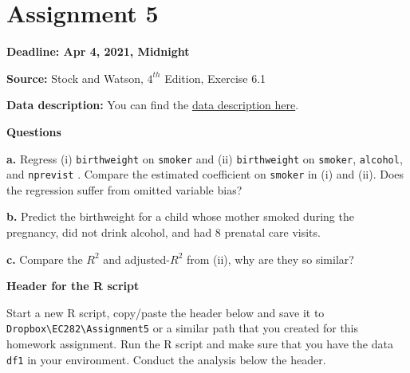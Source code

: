 \documentclass[
]{book}
\begin{document}
\hypertarget{assignment-5}{%
\section{Assignment 5}\label{assignment-5}}

\textbf{Deadline: Apr 4, 2021, Midnight}

\textbf{Source:} Stock and Watson, \(4^{th}\) Edition, Exercise 6.1

\textbf{Data description:} You can find the \href{https://www.dropbox.com/s/s0q564v6lplbexu/Birthweight_Smoking_Description.pdf?dl=1}{data description here}.

\textbf{Questions}

\textbf{a.} Regress (i) \texttt{birthweight} on \texttt{smoker} and (ii) \texttt{birthweight} on \texttt{smoker}, \texttt{alcohol}, and \texttt{nprevist} . Compare the estimated coefficient on \texttt{smoker} in (i) and (ii). Does the regression suffer from omitted variable bias?

\textbf{b.} Predict the birthweight for a child whose mother smoked during the pregnancy, did not drink alcohol, and had 8 prenatal care visits.

\textbf{c.} Compare the \(R^2\) and adjusted-\(R^2\) from (ii), why are they so similar?

\textbf{Header for the R script}

Start a new R script, copy/paste the header below and save it to \texttt{Dropbox\textbackslash{}EC282\textbackslash{}Assignment5} or a similar path that you created for this homework assignment. Run the R script and make sure that you have the data \texttt{df1} in your environment. Conduct the analysis below the header.
\end{document}
